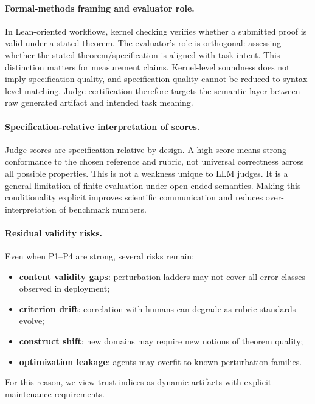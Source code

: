 \paragraph{Formal-methods framing and evaluator role.}
In Lean-oriented workflows, kernel checking verifies whether a submitted proof is valid under a stated theorem.
The evaluator's role is orthogonal: assessing whether the stated theorem/specification is aligned with task intent.
This distinction matters for measurement claims.
Kernel-level soundness does not imply specification quality, and specification quality cannot be reduced to syntax-level matching.
Judge certification therefore targets the semantic layer between raw generated artifact and intended task meaning.

\paragraph{Specification-relative interpretation of scores.}
Judge scores are specification-relative by design.
A high score means strong conformance to the chosen reference and rubric, not universal correctness across all possible properties.
This is not a weakness unique to LLM judges.
It is a general limitation of finite evaluation under open-ended semantics.
Making this conditionality explicit improves scientific communication and reduces over-interpretation of benchmark numbers.

\paragraph{Residual validity risks.}
Even when P1--P4 are strong, several risks remain:
\begin{itemize}
\item \textbf{content validity gaps}: perturbation ladders may not cover all error classes observed in deployment;
\item \textbf{criterion drift}: correlation with humans can degrade as rubric standards evolve;
\item \textbf{construct shift}: new domains may require new notions of theorem quality;
\item \textbf{optimization leakage}: agents may overfit to known perturbation families.
\end{itemize}
For this reason, we view trust indices as dynamic artifacts with explicit maintenance requirements.

